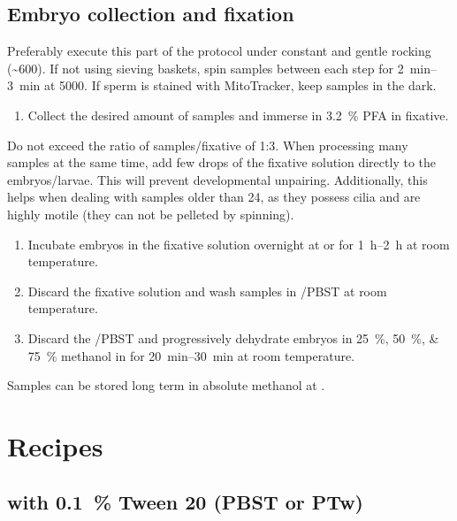 \documentclass[10pt]{report}
\begin{document}
\subsection*{Embryo collection and fixation}

\alert{Preferably execute this part of the protocol under constant and gentle rocking (\qty{~600}{\rpm}).}
\alert{If not using sieving baskets, spin samples between each step for \qtyrange{2}{3}{\minute} at \qty[scientific-notation = false, group-digits = false]{5000}{\rpm}.}
\alert{If sperm is stained with MitoTracker, keep samples in the dark.}

\begin{enumerate}[series = steps]
	\item Collect the desired amount of samples and immerse in \qty{3.2}{\percent} PFA in \pbs{} fixative.
\end{enumerate}

\bigskip\alert{Do not exceed the ratio of samples/fixative of 1:3.}
\alert{When processing many samples at the same time, add few drops of the fixative solution directly to the embryos/larvae. This will prevent developmental unpairing. Additionally, this helps when dealing with samples older than \qty{24}{\hpf}, as they possess cilia and are highly motile (they can not be pelleted by spinning).}

\begin{enumerate}[resume = steps]
	\item Incubate embryos in the fixative solution overnight at \fourdegree{} or for \qtyrange{1}{2}{\hour} at room temperature.
	\item Discard the fixative solution and wash samples  in \pbs{}/PBST at room temperature.
	\item Discard the \pbs{}/PBST and progressively dehydrate embryos in \qtylist{25;50;75}{\percent} methanol in \pbs{} for \qtyrange{20}{30}{\minute} at room temperature.
\end{enumerate}

\bigskip\alert{Samples can be stored long term in absolute methanol at \minustwenty.}

\clearpage

\section*{\textendash{} Recipes \textendash{}}

\subsection*{\pbs{} with \qty{0.1}{\percent} Tween 20 (PBST or PTw)}
\end{document}
